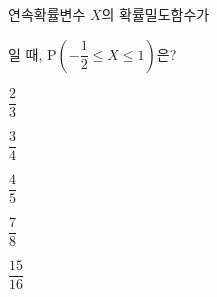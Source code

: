 연속확률변수 $X$의 확률밀도함수가 \par\smallskip{}\par\smallskip\noindent 일 때, $\mathrm{P}\left(-\dfrac{1}{2}\le X\le 1\right)$은? 
\begin{choices32}{\rule[-3ex]{0pt}{8ex}$\dfrac{2}{3}$}{\rule[-3ex]{0pt}{8ex}$\dfrac{3}{4}$}{\rule[-3ex]{0pt}{8ex}$\dfrac{4}{5}$}{\rule[-3ex]{0pt}{8ex}$\dfrac{7}{8}$}{\rule[-3ex]{0pt}{8ex}$\dfrac{15}{16}$}\end{choices32}
